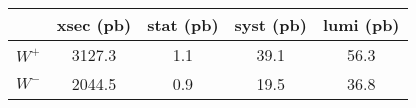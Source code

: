 
     \begin{tabular}{lcccc}
      \hline
      \hline
      & xsec (pb) & stat (pb) & syst (pb) & lumi (pb) \\
      \hline
      $W^+$ & 3127.3 & 1.1  & 39.1 & 56.3  \\
      $W^-$ & 2044.5 & 0.9  & 19.5 & 36.8  \\
      \hline
      \hline
    \end{tabular}

    
